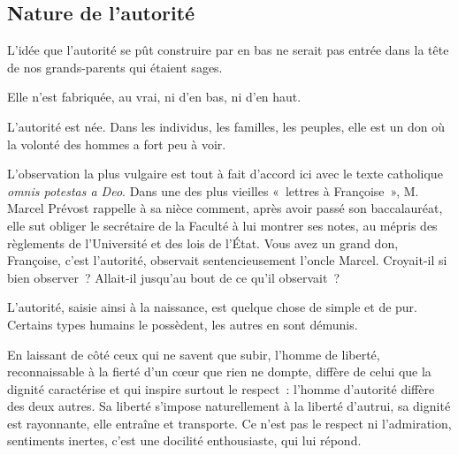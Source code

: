 \documentclass[french,twoside]{book} %
\newcommand{\astermono}{\medskip\centerline{\color{rubric}\large\selectfont{\syms ✻}}\medskip\par}%
\begin{document}
\subsection[{Nature de l’autorité}]{Nature de l’autorité}
\noindent L’idée que l’autorité se pût construire par en bas ne serait pas entrée dans la tête de nos grands-parents qui étaient sages.\par
Elle n’est fabriquée, au vrai, ni d’en bas, ni d’en haut.\par
L’autorité est née. Dans les individus, les familles, les peuples, elle est un don où la volonté des hommes a fort peu à voir.\par
L’observation la plus vulgaire est tout à fait d’accord ici avec le texte catholique \emph{omnis potestas a Deo}. Dans une des plus vieilles « lettres à Françoise », M. Marcel Prévost rappelle à sa nièce comment, après avoir passé son baccalauréat, elle sut obliger le secrétaire de la Faculté à lui montrer ses notes, au mépris des règlements de l’Université et des lois de l’État. Vous avez un grand don, Françoise, c’est l’autorité, observait sentencieusement l’oncle Marcel. Croyait-il si bien observer ? Allait-il jusqu’au bout de ce qu’il observait ?\par
L’autorité, saisie ainsi à la naissance, est quelque chose de simple et de pur. Certains types humains le possèdent, les autres en sont démunis.\par
En laissant de côté ceux qui ne savent que subir, l’homme de liberté, reconnaissable à la fierté d’un cœur que rien ne dompte, diffère de celui que la dignité caractérise et qui inspire surtout le respect : l’homme d’autorité diffère des deux autres. Sa liberté s’impose naturellement à la liberté d’autrui, sa dignité est rayonnante, elle entraîne et transporte. Ce n’est pas le respect ni l’admiration, sentiments inertes, c’est une docilité enthousiaste, qui lui répond.\par

\astermono
\end{document}
